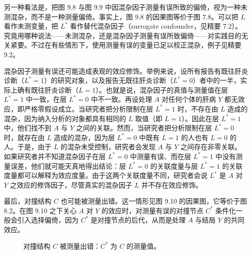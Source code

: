 另一种看法是，把图 9.8 与图 9.9 中因混杂因子测量有误所致的偏倚，视为一种未测混杂，而不是一种测量偏倚。事实上，图 9.8 的因果图等价于图 7.8。可以把 $L$ 看作未测变量，把 $L^{*}$ 看作替代混杂因子（surrogate confounder，见精要 7.2）。究竟用哪种说法——未测混杂，还是混杂因子测量有误所致偏倚——对实践目的无关紧要。不过在有些情形下，使用测量有误的变量已足以校正混杂，例子见精要 9.2。

混杂因子测量有误还可能造成表观的效应修饰。举例来说，设所有报告有既往肝炎诊断（$L^{*}=1$）的研究对象，以及报告无既往肝炎诊断（$L^{*}=0$）者中的一半，实际上确有既往肝炎诊断（$L=1$）。也就是说，混杂因子的真值与测量值在层 $L^{*}=1$ 中一致，在层 $L^{*}=0$ 中不一致。再设处理 $A$ 对任何个体的肝病 $Y$ 都无效应，即严格零假设成立。当研究者把分析限制在层 $L^{*}=1$ 时，不存在由 $L$ 造成的混杂，因为纳入分析的对象都具有相同的 $L$ 取值（即 $L=1$）。因此在层 $L^{*}=1$ 中，他们找不到 $A$ 与 $Y$ 之间的关联。然而，当研究者把分析限制在层 $L^{*}=0$ 时，就存在由 $L$ 造成的混杂，因为层 $L^{*}=0$ 中既有 $L=1$ 的人也有 $L=0$ 的人。于是，由于 $L$ 的混杂未受控制，研究者会发现 $A$ 与 $Y$ 之间存在非零关联。如果研究者并不知道混杂因子在层 $L^{*}=0$ 中测量有误、而在层 $L^{*}=1$ 中没有测量误差，他们就可能天真地得出结论：层 $L^{*}=0$ 的关联度量与层 $L^{*}=1$ 的关联度量都可以解释为效应度量。由于这两个关联度量不同，研究者会说 $L^{*}$ 是 $A$ 对 $Y$ 之效应的修饰因子，尽管真实的混杂因子 $L$ 并不存在效应修饰。

最后，对撞结构 $C$ 也可能被测量出错。这一情形见图 9.10 的因果图，它等价于图 8.2。在图 9.10 之下关心 $A$ 对 $Y$ 的效应时，对测量有误的对撞节点 $C^{*}$ 条件化一般会引入选择偏倚，因为 $C^{*}$ 是对撞节点的后代，从而是处理 $A$ 与结局 $Y$ 的共同效应。

\begin{figure}[htbp]
\centering
{}
\caption{对撞结构 $C$ 被测量出错：$C^{*}$ 为 $C$ 的测量值。}
\label{fig:9.10}
\end{figure}

